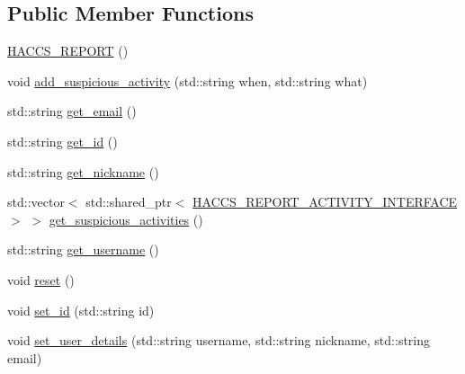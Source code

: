 \subsection*{Public Member Functions}
\begin{DoxyCompactItemize}
\item 
\hyperlink{classAsteroids_1_1Domain_1_1Server_1_1HACCS__REPORT_a23cfcd0e92df6dd9c5f6b3ddbf3af55f}{H\+A\+C\+C\+S\+\_\+\+R\+E\+P\+O\+RT} ()
\item 
void \hyperlink{classAsteroids_1_1Domain_1_1Server_1_1HACCS__REPORT_ad05d48af0fc073b5b4f1889044d0ab53}{add\+\_\+suspicious\+\_\+activity} (std\+::string when, std\+::string what)
\item 
std\+::string \hyperlink{classAsteroids_1_1Domain_1_1Server_1_1HACCS__REPORT_a6782df87aa6252fa3a77ffed948d5dd7}{get\+\_\+email} ()
\item 
std\+::string \hyperlink{classAsteroids_1_1Domain_1_1Server_1_1HACCS__REPORT_a8e8b4f73eed2ab97cbad9aaf6ba6f23d}{get\+\_\+id} ()
\item 
std\+::string \hyperlink{classAsteroids_1_1Domain_1_1Server_1_1HACCS__REPORT_a9e38472572d93ccb521931abf8fe4003}{get\+\_\+nickname} ()
\item 
std\+::vector$<$ std\+::shared\+\_\+ptr$<$ \hyperlink{classAsteroids_1_1Domain_1_1Server_1_1HACCS__REPORT__ACTIVITY__INTERFACE}{H\+A\+C\+C\+S\+\_\+\+R\+E\+P\+O\+R\+T\+\_\+\+A\+C\+T\+I\+V\+I\+T\+Y\+\_\+\+I\+N\+T\+E\+R\+F\+A\+CE} $>$ $>$ \hyperlink{classAsteroids_1_1Domain_1_1Server_1_1HACCS__REPORT_a39e82d7e504a456087aca358e059486e}{get\+\_\+suspicious\+\_\+activities} ()
\item 
std\+::string \hyperlink{classAsteroids_1_1Domain_1_1Server_1_1HACCS__REPORT_aee592bffda2ed344b0e1d3c52ef5f22b}{get\+\_\+username} ()
\item 
void \hyperlink{classAsteroids_1_1Domain_1_1Server_1_1HACCS__REPORT_a8ac70a5b53e7c93a8cefd963c35f3efa}{reset} ()
\item 
void \hyperlink{classAsteroids_1_1Domain_1_1Server_1_1HACCS__REPORT_afd4fb5bff2bc5e2de54bdf5c56d17ce7}{set\+\_\+id} (std\+::string id)
\item 
void \hyperlink{classAsteroids_1_1Domain_1_1Server_1_1HACCS__REPORT_aac58cb81d18beb43c31cc11610dd319f}{set\+\_\+user\+\_\+details} (std\+::string username, std\+::string nickname, std\+::string email)
\end{DoxyCompactItemize}
